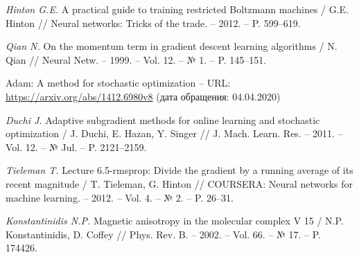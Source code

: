 \begin{thebibliography}{10}
    \textit{Hinton G.E.} A practical guide to training restricted Boltzmann machines / 
    G.E. Hinton //
    Neural networks: Tricks of the trade. -- 2012. -- P. 599--619.
    
    \textit{Qian N.} On the momentum term in gradient descent learning algorithms / 
    N. Qian //
    Neural Netw. -- 1999. -- Vol. 12. -- № 1. -- P. 145--151.
    
    Adam: A method for stochastic optimization -- URL: \url{https://arxiv.org/abs/1412.6980v8} (дата обращения: 04.04.2020)
    
    \textit{Duchi J.} Adaptive subgradient methods for online learning and stochastic optimization / 
    J. Duchi, E. Hazan, Y. Singer //
    J. Mach. Learn. Res. -- 2011. -- Vol. 12. -- № Jul. -- P. 2121--2159.
    
    \textit{Tieleman T.} Lecture 6.5-rmsprop: Divide the gradient by a running average of its recent magnitude / 
    T. Tieleman, G. Hinton //
    COURSERA: Neural networks for machine learning. -- 2012. -- Vol. 4. -- № 2. -- P. 26--31.
    
    \textit{Konstantinidis N.P.} Magnetic anisotropy in the molecular complex V 15 / 
    N.P. Konstantinidis, D. Coffey //
    Phys. Rev. B. -- 2002. -- Vol. 66. -- № 17. -- P. 174426.
\end{thebibliography}
